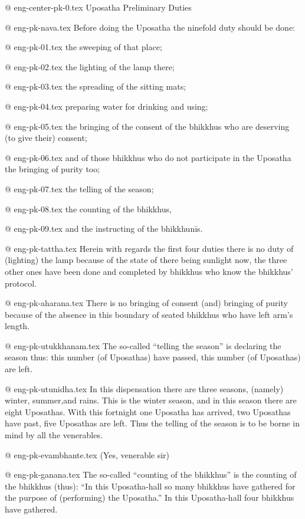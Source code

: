
@ eng-center-pk-0.tex
Uposatha Preliminary Duties

@ eng-pk-nava.tex
Before doing the Uposatha the ninefold duty should be done:

@ eng-pk-01.tex
the sweeping of that place;

@ eng-pk-02.tex
the lighting of the lamp there;

@ eng-pk-03.tex
the spreading of the sitting mats;

@ eng-pk-04.tex
preparing water for drinking and using;

@ eng-pk-05.tex
the bringing of the consent of the bhikkhus who are deserving (to give their) consent;

@ eng-pk-06.tex
and of those bhikkhus who do not participate in the Uposatha the bringing of purity too;

@ eng-pk-07.tex
the telling of the season;

@ eng-pk-08.tex
the counting of the bhikkhus,

@ eng-pk-09.tex
and the instructing of the bhikkhunīs.

@ eng-pk-tattha.tex
Herein with regards the first four duties there is no duty of (lighting) the lamp because of the state of there being sunlight now, the three other ones have been done and completed by bhikkhus who know the bhikkhus' protocol.

@ eng-pk-aharana.tex
There is no bringing of consent (and) bringing of purity because of the absence in this boundary of seated bhikkhus who have left arm's length.

@ eng-pk-utukkhanam.tex
The so-called “telling the season” is declaring the season thus: this number (of Uposathas) have passed, this number (of Uposathas) are left.

@ eng-pk-utunidha.tex
In this dispensation there are three seasons, (namely) winter, summer,and rains. This is the winter season, and in this season there are eight Uposathas. With this fortnight one Uposatha has arrived, two Uposathas have past, five Uposathas are left. Thus the telling of the season is to be borne in mind by all the venerables.

@ eng-pk-evambhante.tex
(Yes, venerable sir)

@ eng-pk-ganana.tex
The so-called “counting of the bhikkhus” is the counting of the bhikkhus (thus): “In this Uposatha-hall so many bhikkhus have gathered for the purpose of (performing) the Uposatha.” 
In this Uposatha-hall four bhikkhus have gathered.

